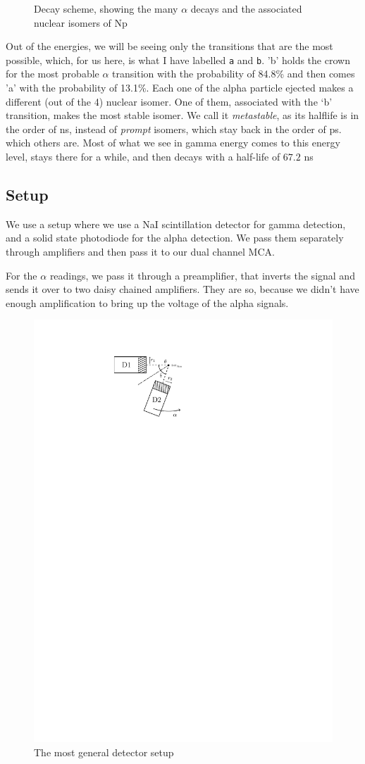 \documentclass{double}
\begin{document}
\begin{multicols*}{2}
\begin{figure}[H]
	\caption{Decay scheme, showing the many $\alpha$ decays
    and the associated nuclear isomers of Np}
    \label{decay}
\end{figure}
Out of the energies, we will be seeing only the transitions
that are the most possible, which, for us here, is what I
have labelled \texttt{a} and \texttt{b}. 'b' holds the crown
for the most probable $\alpha$ transition with the
probability of 84.8\% and then comes 'a' with the
probability of 13.1\%. Each one of the alpha particle
ejected makes a different (out of the 4) nuclear isomer. One
of them, associated with the `b' transition, makes the most
stable isomer. We call it \emph{metastable}, as its halflife is in
the order of ns, instead of \emph{prompt} isomers, which
stay back in the order of ps. which others are. Most of what
we see in gamma energy comes to this energy level, stays
there for a while, and then decays with a half-life of
$67.2$ ns

\subsection{Setup}
We use a setup where we use a NaI scintillation detector for
gamma detection, and a solid state photodiode for the alpha
detection. We pass them separately through amplifiers and
then pass it to our dual channel MCA.

For the $\alpha$ readings, we pass it through a
preamplifier, that inverts the signal and sends it over to
two daisy chained amplifiers. They are so, because we didn't
have enough amplification to bring up the voltage of the
alpha signals. 

\begin{figure}[H]
    \centering
    \includegraphics[width=0.6\columnwidth]{images/detectors.pdf}
    \caption{The most general detector setup}
    \label{detect}
\end{figure}


\end{multicols*}
\end{document}
